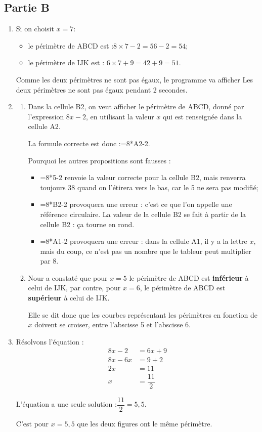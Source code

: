 \documentclass[12pt,a4paper,french]{article}
\begin{document}
\subsection*{Partie B}
\begin{enumerate}
	\item Si on choisit $x = 7$:
	\begin{itemize}
		\item le périmètre de ABCD est :\quad $8 \times 7 - 2 = 56 - 2 = 54$;
		\item le périmètre de IJK est : \quad $6 \times 7 + 9 = 42 + 9 = 51$.
	\end{itemize}
	Comme les deux périmètres ne sont pas égaux, le programme va afficher \og Les deux périmètres ne sont pas égaux \fg{} pendant 2 secondes.

	\item \begin{enumerate}
		\item Dans la cellule \textsf{B2}, on veut afficher le périmètre de ABCD, donné par l'expression $8x - 2$, en utilisant la valeur $x$ qui est renseignée dans la cellule \textsf{A2}.

		La formule correcte est donc :\quad \textsf{=8*A2-2}.

		Pourquoi les autres propositions sont fausses :
		\begin{itemize}
			\item \textsf{=8*5-2} \quad renvoie la valeur correcte pour la cellule \textsf{B2}, mais renverra toujours 38 quand on l'étirera vers le bas, car le \textsf{5} ne sera pas modifié;
			\item \textsf{=8*B2-2} \quad provoquera une erreur : c'est ce que l'on appelle une référence circulaire. La valeur de la cellule \textsf{B2} se fait à partir de la cellule \textsf{B2} : ça tourne en rond.
			\item \textsf{=8*A1-2} \quad provoquera une erreur : dans la cellule \textsf{A1}, il y a la lettre $x$, mais du coup, ce n'est pas un nombre que le tableur peut multiplier par 8.
		\end{itemize}

		\item Nour a constaté que pour $x = 5$ le périmètre de ABCD est \textbf{inférieur} à celui de IJK, par contre, pour $x = 6$, le périmètre de ABCD est \textbf{supérieur} à celui de IJK.

		Elle se dit donc que les courbes représentant les périmètres en fonction de $x$ doivent se croiser, entre l'abscisse 5 et l'abscisse 6.
	\end{enumerate}
	\item Résolvons l'équation :
	\begin{align*}
		8x - 2  & = 6x + 9        \\
		8x - 6x & = 9 + 2         \\
		2x      & = 11            \\
		x       & = \dfrac{11}{2}
	\end{align*}

	L'équation a une seule solution :\quad $\dfrac{11}{2} = 5,5$.

	C'est pour $x = 5,5$ que les deux figures ont le même périmètre.
\end{enumerate}
\end{document}
